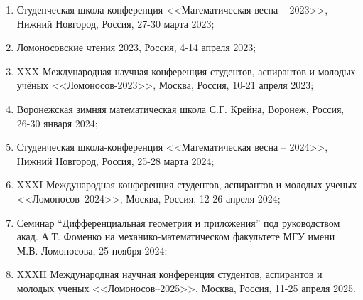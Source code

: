 \begin{enumerate}%
\item Студенческая школа-конференция <<Математическая весна --  2023>>, Нижний Новгород, Россия, 27-30 марта 2023;

\item Ломоносовские чтения 2023, Россия, 4-14 апреля 2023;

\item XXX Международная научная конференция студентов, аспирантов и молодых учёных <<Ломоносов-2023>>,  Москва, Россия, 10-21 апреля 2023;

\item Воронежская зимняя математическая школа С.Г. Крейна, Воронеж, Россия, 26-30 января 2024;

\item Студенческая школа-конференция <<Математическая весна -- 2024>>, Нижний Новгород, Россия, 25-28 марта 2024;

\item XXXI Международная конференция студентов, аспирантов и молодых ученых <<Ломоносов--2024>>, Москва, Россия, 12-26 апреля 2024;

\item Семинар “Дифференциальная геометрия и приложения” под руководством акад. А.Т. Фоменко на механико-математическом факультете МГУ имени М.В. Ломоносова, 25 ноября 2024;


\item XXXII Международная научная конференция студентов, аспирантов и молодых ученых <<Ломоносов--2025>>, Москва, Россия, 11-25 апреля 2025.
\end{enumerate}


